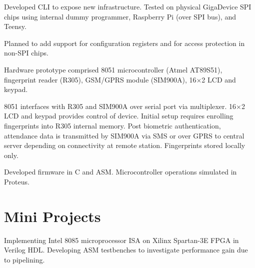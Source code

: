 \documentclass[]{deedy}
\begin{document}
\begin{minipage}[t]{0.72\textwidth}
\begin{flushleft}
\begin{tightemize}
\item Developed CLI to expose new infrastructure. Tested on physical GigaDevice SPI chips using internal dummy programmer, Raspberry Pi (over SPI bus), and Teensy.
\item Planned to add support for configuration registers and for access protection in non-SPI chips.
\end{tightemize}
\sectionsep
%
\begin{tightemize}
\item Hardware prototype comprised 8051 microcontroller (Atmel AT89S51), fingerprint reader (R305), GSM/GPRS module (SIM900A), 16$\times$2 LCD and keypad.
\item 8051 interfaces with R305 and SIM900A over serial port via multiplexer. 16$\times$2 LCD and keypad provides control of device. Initial setup requires enrolling fingerprints into R305 internal memory. Post biometric authentication, attendance data is transmitted by SIM900A via SMS or over GPRS to central server depending on connectivity at remote station. Fingerprints stored locally only.
\item Developed firmware in C and ASM. Microcontroller operations simulated in Proteus.
\end{tightemize}
\sectionsep
\section{Mini Projects}
%
\begin{tightemize}
\item Implementing Intel 8085 microprocessor ISA on Xilinx Spartan-3E FPGA in Verilog HDL. Developing ASM testbenches to investigate performance gain due to pipelining.
\end{tightemize}
\sectionsep
%
\end{flushleft}
\end{minipage}
\end{document}

